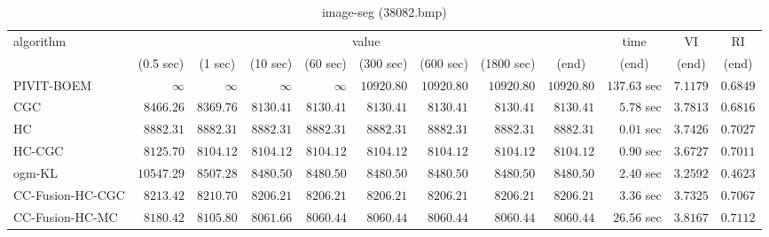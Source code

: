 \begin{table}[H]
\scriptsize
\centering
\caption{image-seg (38082.bmp)}
\label{tab:anytimetable-image-seg-38082.bmp}
\begin{tabular}{lrrrrrrrrrrr}
\toprule
           algorithm &                                   \multicolumn{8}{c}{value} & \multicolumn{1}{c}{time}    & \multicolumn{1}{c}{VI}  & \multicolumn{1}{c}{RI} \\  
\cmidrule(lr){2-9}\cmidrule(lr){10-10} \cmidrule(lr){11-11} \cmidrule(lr){12-12}   
                     & \multicolumn{1}{c}{(0.5 sec)} & \multicolumn{1}{c}{(1 sec)} & \multicolumn{1}{c}{(10 sec)} & \multicolumn{1}{c}{(60 sec)} & \multicolumn{1}{c}{(300 sec)} & \multicolumn{1}{c}{(600 sec)} & \multicolumn{1}{c}{(1800 sec)} & \multicolumn{1}{c}{(end)} & \multicolumn{1}{c}{(end)}    & \multicolumn{1}{c}{(end)}   & \multicolumn{1}{c}{(end)}  \\ \midrule 
          PIVIT-BOEM & $\infty$ & $\infty$ & $\infty$ & $\infty$ & $     10920.80$ & $     10920.80$ & $     10920.80$ & $     10920.80$ & $       137.63$ sec    & $       7.1179$  & $       0.6849$ \\ 
                 CGC & $      8466.26$ & $      8369.76$ & $      8130.41$ & $      8130.41$ & $      8130.41$ & $      8130.41$ & $      8130.41$ & $      8130.41$ & $         5.78$ sec    & $       3.7813$  & $       0.6816$ \\ 
                  HC & $      8882.31$ & $      8882.31$ & $      8882.31$ & $      8882.31$ & $      8882.31$ & $      8882.31$ & $      8882.31$ & $      8882.31$ & $         0.01$ sec    & $       3.7426$  & $       0.7027$ \\ 
              HC-CGC & $      8125.70$ & $      8104.12$ & $      8104.12$ & $      8104.12$ & $      8104.12$ & $      8104.12$ & $      8104.12$ & $      8104.12$ & $         0.90$ sec    & $       3.6727$  & $       0.7011$ \\ 
              ogm-KL & $     10547.29$ & $      8507.28$ & $      8480.50$ & $      8480.50$ & $      8480.50$ & $      8480.50$ & $      8480.50$ & $      8480.50$ & $         2.40$ sec    & $       3.2592$  & $       0.4623$ \\ 
    CC-Fusion-HC-CGC & $      8213.42$ & $      8210.70$ & $      8206.21$ & $      8206.21$ & $      8206.21$ & $      8206.21$ & $      8206.21$ & $      8206.21$ & $         3.36$ sec    & $       3.7325$  & $       0.7067$ \\ 
     CC-Fusion-HC-MC & $      8180.42$ & $      8105.80$ & $      8061.66$ & $      8060.44$ & $      8060.44$ & $      8060.44$ & $      8060.44$ & $      8060.44$ & $        26.56$ sec    & $       3.8167$  & $       0.7112$ \\ 

\end{tabular}
\end{table}

